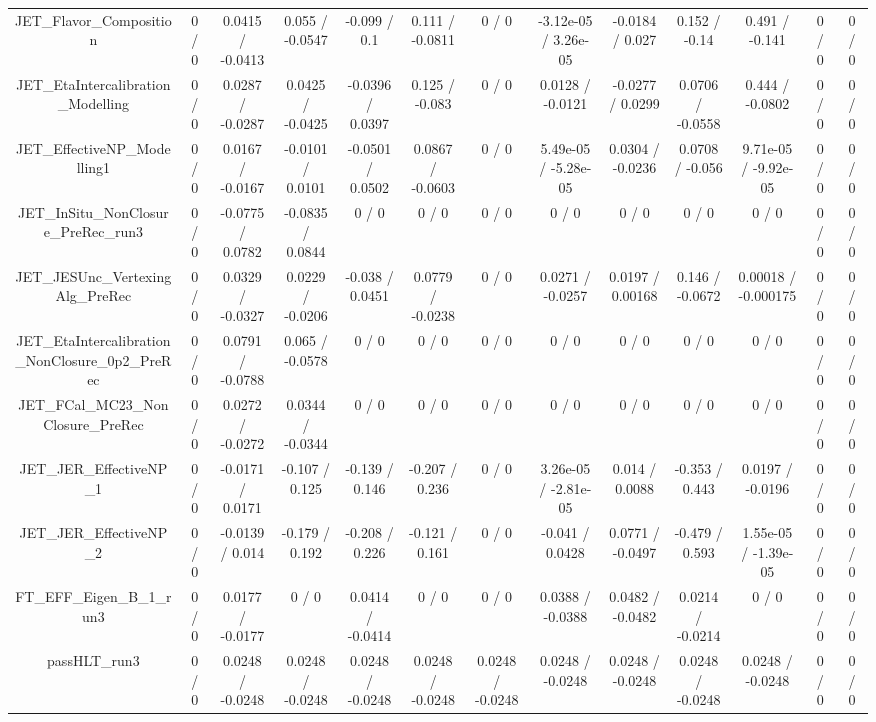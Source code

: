\documentclass[10pt]{article}
\begin{document}
\begin{table}[htbp]
\begin{center}
\begin{tabular}{|c|c|c|c|c|c|c|c|c|c|c|c|c|}
  JET_Flavor_Composition & 0 / 0 & 0.0415 / -0.0413 & 0.055 / -0.0547 & -0.099 / 0.1 & 0.111 / -0.0811 & 0 / 0 & -3.12e-05 / 3.26e-05 & -0.0184 / 0.027 & 0.152 / -0.14 & 0.491 / -0.141 & 0 / 0 & 0 / 0 \\ 
  JET_EtaIntercalibration_Modelling & 0 / 0 & 0.0287 / -0.0287 & 0.0425 / -0.0425 & -0.0396 / 0.0397 & 0.125 / -0.083 & 0 / 0 & 0.0128 / -0.0121 & -0.0277 / 0.0299 & 0.0706 / -0.0558 & 0.444 / -0.0802 & 0 / 0 & 0 / 0 \\ 
  JET_EffectiveNP_Modelling1 & 0 / 0 & 0.0167 / -0.0167 & -0.0101 / 0.0101 & -0.0501 / 0.0502 & 0.0867 / -0.0603 & 0 / 0 & 5.49e-05 / -5.28e-05 & 0.0304 / -0.0236 & 0.0708 / -0.056 & 9.71e-05 / -9.92e-05 & 0 / 0 & 0 / 0 \\ 
  JET_InSitu_NonClosure_PreRec_run3 & 0 / 0 & -0.0775 / 0.0782 & -0.0835 / 0.0844 & 0 / 0 & 0 / 0 & 0 / 0 & 0 / 0 & 0 / 0 & 0 / 0 & 0 / 0 & 0 / 0 & 0 / 0 \\ 
  JET_JESUnc_VertexingAlg_PreRec & 0 / 0 & 0.0329 / -0.0327 & 0.0229 / -0.0206 & -0.038 / 0.0451 & 0.0779 / -0.0238 & 0 / 0 & 0.0271 / -0.0257 & 0.0197 / 0.00168 & 0.146 / -0.0672 & 0.00018 / -0.000175 & 0 / 0 & 0 / 0 \\ 
  JET_EtaIntercalibration_NonClosure_0p2_PreRec & 0 / 0 & 0.0791 / -0.0788 & 0.065 / -0.0578 & 0 / 0 & 0 / 0 & 0 / 0 & 0 / 0 & 0 / 0 & 0 / 0 & 0 / 0 & 0 / 0 & 0 / 0 \\ 
  JET_FCal_MC23_NonClosure_PreRec & 0 / 0 & 0.0272 / -0.0272 & 0.0344 / -0.0344 & 0 / 0 & 0 / 0 & 0 / 0 & 0 / 0 & 0 / 0 & 0 / 0 & 0 / 0 & 0 / 0 & 0 / 0 \\ 
  JET_JER_EffectiveNP_1 & 0 / 0 & -0.0171 / 0.0171 & -0.107 / 0.125 & -0.139 / 0.146 & -0.207 / 0.236 & 0 / 0 & 3.26e-05 / -2.81e-05 & 0.014 / 0.0088 & -0.353 / 0.443 & 0.0197 / -0.0196 & 0 / 0 & 0 / 0 \\ 
  JET_JER_EffectiveNP_2 & 0 / 0 & -0.0139 / 0.014 & -0.179 / 0.192 & -0.208 / 0.226 & -0.121 / 0.161 & 0 / 0 & -0.041 / 0.0428 & 0.0771 / -0.0497 & -0.479 / 0.593 & 1.55e-05 / -1.39e-05 & 0 / 0 & 0 / 0 \\ 
  FT_EFF_Eigen_B_1_run3 & 0 / 0 & 0.0177 / -0.0177 & 0 / 0 & 0.0414 / -0.0414 & 0 / 0 & 0 / 0 & 0.0388 / -0.0388 & 0.0482 / -0.0482 & 0.0214 / -0.0214 & 0 / 0 & 0 / 0 & 0 / 0 \\ 
  passHLT_run3 & 0 / 0 & 0.0248 / -0.0248 & 0.0248 / -0.0248 & 0.0248 / -0.0248 & 0.0248 / -0.0248 & 0.0248 / -0.0248 & 0.0248 / -0.0248 & 0.0248 / -0.0248 & 0.0248 / -0.0248 & 0.0248 / -0.0248 & 0 / 0 & 0 / 0 \\ 

\end{tabular}
\end{center}
\end{table}
\end{document}
